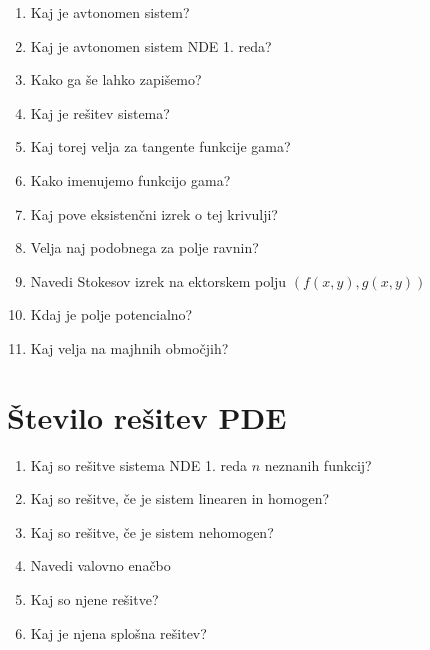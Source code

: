 \documentclass{article}
\begin{document}
\begin{enumerate}
        \item Kaj je avtonomen sistem?
        \item Kaj je avtonomen sistem NDE 1. reda?
        \item Kako ga še lahko zapišemo?
        \item Kaj je rešitev sistema?
        \item Kaj torej velja za tangente funkcije gama?
        \item Kako imenujemo funkcijo gama?
        \item Kaj pove eksistenčni izrek o tej krivulji?
        \item Velja naj podobnega za polje ravnin? 
        \item Navedi Stokesov izrek na ektorskem polju $(f(x, y), g(x, y))$
        \item Kdaj je polje potencialno?
        \item Kaj velja na majhnih območjih?
    \end{enumerate}

    \section{Število rešitev PDE}
    \begin{enumerate}
        \item Kaj so rešitve sistema NDE 1. reda $n$ neznanih funkcij?
        \item Kaj so rešitve, če je sistem linearen in homogen?
        \item Kaj so rešitve, če je sistem nehomogen?
        \item Navedi valovno enačbo
        \item Kaj so njene rešitve?
        \item Kaj je njena splošna rešitev?
    \end{enumerate}
\end{document}
